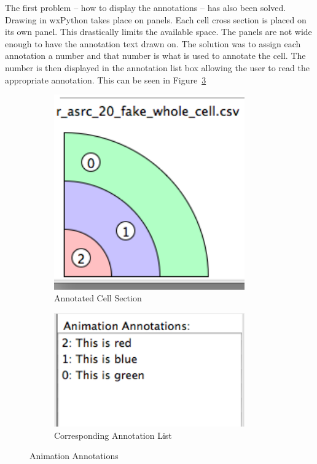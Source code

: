 The first problem -- how to display the annotations -- has also been solved.  Drawing in wxPython takes place on panels.  Each cell cross section is placed on its own panel.  This drastically limits the available space.  The panels are not wide enough to have the annotation text drawn on.  The solution was to assign each annotation a number and that number is what is used to annotate the cell.  The number is then displayed in the annotation list box allowing the user to read the appropriate annotation.  This can be seen in Figure~\ref{fig:annotation_whole}

\begin{figure}[h!]
    \centering
    \begin{subfigure}[b]{0.4\textwidth}
        \centering
        \includegraphics[width=0.9\textwidth]{images/annotation_whole_b.png}
        \caption{Annotated Cell Section}
        \label{fig:annotation_whole_cell}
    \end{subfigure}
    \begin{subfigure}[b]{0.4\textwidth}
        \centering
        \includegraphics[width=0.9\textwidth]{images/annotation_whole_a.png}
        \caption{Corresponding Annotation List}
        \label{fig:annotation_whole_list}
    \end{subfigure}
    \caption{Animation Annotations}
    \label{fig:annotation_whole}
\end{figure}

